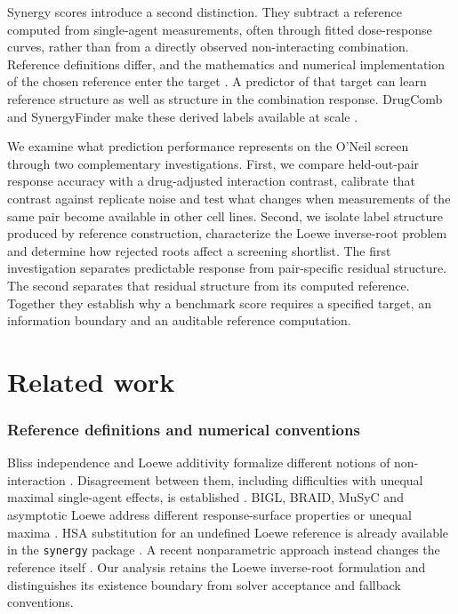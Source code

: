 \documentclass[11pt]{article}
\begin{document}
Synergy scores introduce a second distinction. They subtract a reference computed from single-agent measurements, often through fitted dose-response curves, rather than from a directly observed non-interacting combination. Reference definitions differ, and the mathematics and numerical implementation of the chosen reference enter the target \citep{bliss1939,loewe1926,greco1995}. A predictor of that target can learn reference structure as well as structure in the combination response. DrugComb and SynergyFinder make these derived labels available at scale \citep{zagidullin2019,zheng2021,ianevski2017,ianevski2020}.

We examine what prediction performance represents on the O'Neil screen through two complementary investigations. First, we compare held-out-pair response accuracy with a drug-adjusted interaction contrast, calibrate that contrast against replicate noise and test what changes when measurements of the same pair become available in other cell lines. Second, we isolate label structure produced by reference construction, characterize the Loewe inverse-root problem and determine how rejected roots affect a screening shortlist. The first investigation separates predictable response from pair-specific residual structure. The second separates that residual structure from its computed reference. Together they establish why a benchmark score requires a specified target, an information boundary and an auditable reference computation.

\section{Related work}\label{sec:related}
\subsubsection*{Reference definitions and numerical conventions}
Bliss independence and Loewe additivity formalize different notions of non-interaction \citep{bliss1939,loewe1926,berenbaum1989,geary2013}. Disagreement between them, including difficulties with unequal maximal single-agent effects, is established \citep{tang2015,lederer2019,vlot2019,grabovsky2004}. BIGL, BRAID, MuSyC and asymptotic Loewe address different response-surface properties or unequal maxima \citep{vanderborght2017,twarog2016,meyer2019,wooten2021musyc,twarog2020}. HSA substitution for an undefined Loewe reference is already available in the \texttt{synergy} package \citep{wooten2021synergy}. A recent nonparametric approach instead changes the reference itself \citep{asiaee2026}. Our analysis retains the Loewe inverse-root formulation and distinguishes its existence boundary from solver acceptance and fallback conventions.
\end{document}
